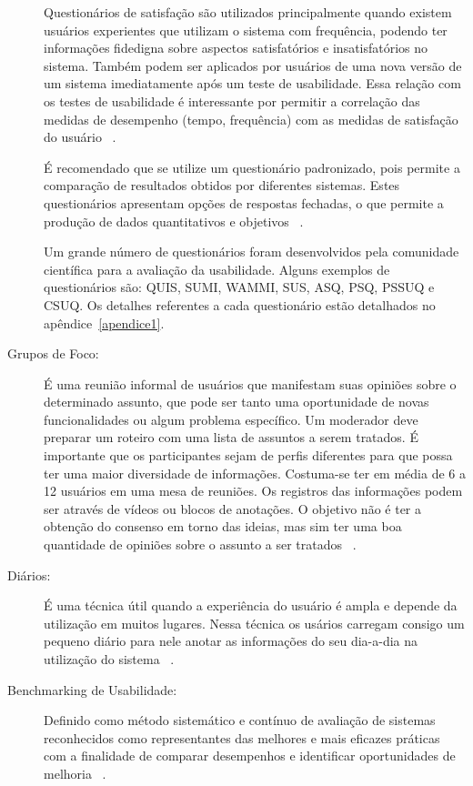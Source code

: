 \begin{description}
	Questionários de satisfação são utilizados principalmente quando existem usuários experientes que utilizam o sistema com frequência, podendo ter informações fidedigna sobre aspectos satisfatórios e insatisfatórios no sistema. Também podem ser aplicados por usuários de uma nova versão de um sistema imediatamente após um teste de usabilidade. Essa relação com os testes de usabilidade é interessante por permitir a correlação das medidas de desempenho (tempo, frequência) com as medidas de satisfação do usuário ~\cite{cybis2010}.

	É recomendado que se utilize um questionário padronizado, pois permite a comparação de resultados obtidos por diferentes sistemas. Estes questionários apresentam opções de respostas fechadas, o que permite a produção de dados quantitativos e objetivos ~\cite{cybis2010}.

	Um grande número de questionários foram desenvolvidos pela comunidade científica para a avaliação da usabilidade.  Alguns exemplos de questionários são: QUIS, SUMI,  WAMMI, SUS, ASQ, PSQ, PSSUQ e CSUQ. Os detalhes referentes a cada questionário estão detalhados no apêndice~\ref{apendice1}.

\item[Grupos de Foco:]

É uma reunião informal de usuários que manifestam suas opiniões sobre o determinado assunto, que pode ser tanto uma oportunidade de novas funcionalidades ou algum problema específico.
%
Um moderador deve preparar um roteiro  com uma lista de assuntos a serem tratados. É importante que os participantes sejam de perfis diferentes para que possa ter uma maior diversidade de informações. Costuma-se ter em média de 6 a 12 usuários em uma mesa de reuniões. Os registros das informações podem ser através de vídeos ou blocos de anotações. O objetivo não é ter a obtenção do consenso em torno das ideias, mas sim ter uma boa quantidade de opiniões sobre o assunto a ser tratados ~\cite{cybis2010}.


\item[Diários:]

	É uma técnica útil quando a experiência do usuário é ampla e depende da utilização em muitos lugares. Nessa técnica os usários carregam consigo um pequeno diário para nele anotar as informações do seu dia-a-dia na utilização do sistema ~\cite{cybis2010}.

\item[Benchmarking de Usabilidade:]

	Definido como método sistemático e contínuo de avaliação de sistemas reconhecidos como representantes das melhores e mais eficazes práticas com a finalidade de comparar desempenhos e identificar oportunidades de melhoria ~\cite{spendolini1994}.


\end{description}
